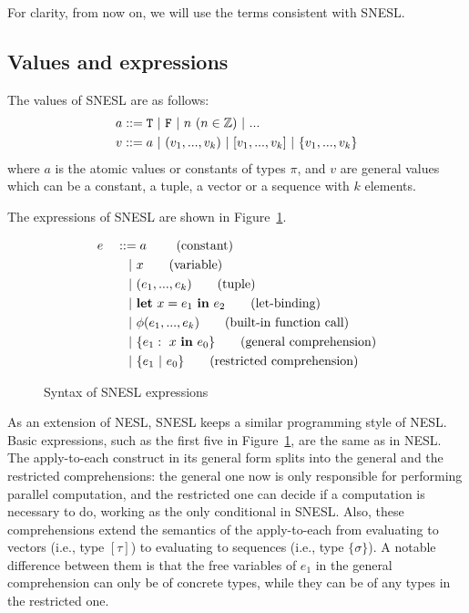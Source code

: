 For clarity, from now on, we will use the terms consistent with SNESL.

\subsection{Values and expressions}

The values of SNESL are as follows:
\begin{align*}
& a ::=  \T \ | \ \F \ | \ n \ (n \in \mathbb{Z}) \ | \ ... \\
& v ::=  a \ | \ (v_1,...,v_k) \ | \ [v_1,...,v_k] \ | \ \{v_1,...,v_k\} 
\end{align*}
where $a$ is the atomic values or constants of types $\pi$, and $v$ are
 general values which can be a constant, a tuple, a vector or a sequence with $k$ elements.  

The expressions of SNESL are shown in Figure~\ref{fig-snesl-exps}.

\begin{figure}[h]\large 
\begin{alignat*}{2}
& e &&::=  a \     \tag{constant} \\
&   && \quad | \ x  \tag{variable} \\
&   && \quad | \ (e_1,...,e_k) \tag{tuple}\\
&   && \quad | \ \mathbf{let} \ x = e_1 \ \mathbf{in} \ e_2 \tag{let-binding}\\
&   && \quad | \ \phi{(e_1,...,e_k)}  \tag{built-in function call} \\
&   && \quad | \ \{e_1: \ x \ \mathbf{in} \ e_0 \} \tag{general comprehension} \\
&   && \quad | \ \{e_1 \ | \ e_0 \}\tag {restricted comprehension} 
\end{alignat*}
\caption{Syntax of SNESL expressions \label{fig-snesl-exps}}
\end{figure}

As an extension of NESL, SNESL keeps a similar programming style of NESL. 
Basic expressions, such as the first five in Figure~\ref{fig-snesl-exps}, are the same as in NESL. 
The apply-to-each construct in its general form splits into the general and the restricted comprehensions:
the general one now is only responsible for performing parallel computation,
and the restricted one can decide if a computation is necessary to do, working as the only conditional in SNESL.
Also, these comprehensions extend the semantics of the apply-to-each from evaluating to vectors (i.e., type $[\tau]$) to evaluating to sequences (i.e., type $\{\sigma\}$). 
A notable difference between them is that the free variables of $e_1$ in the general comprehension can only be of concrete types, while they can be of any types in the restricted one.

